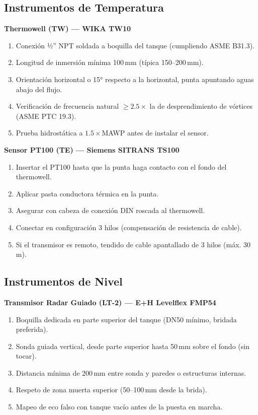 \documentclass[12pt,letterpaper]{article}
\begin{document}
\subsection{Instrumentos de Temperatura}

\textbf{Thermowell (TW) — WIKA TW10}
\begin{enumerate}[leftmargin=1.5cm, label=\arabic*.]
  \item Conexión ½'' NPT soldada a boquilla del tanque (cumpliendo ASME B31.3).
  \item Longitud de inmersión mínima 100\,mm (típica 150--200\,mm).
  \item Orientación horizontal o 15° respecto a la horizontal, punta apuntando aguas abajo del flujo.
  \item Verificación de frecuencia natural $\geq2.5\times$ la de desprendimiento de vórtices (ASME PTC 19.3).
  \item Prueba hidrostática a $1.5\times$MAWP antes de instalar el sensor.
\end{enumerate}

\textbf{Sensor PT100 (TE) — Siemens SITRANS TS100}
\begin{enumerate}[leftmargin=1.5cm, label=\arabic*.]
  \item Insertar el PT100 hasta que la punta haga contacto con el fondo del thermowell.
  \item Aplicar pasta conductora térmica en la punta.
  \item Asegurar con cabeza de conexión DIN roscada al thermowell.
  \item Conectar en configuración 3 hilos (compensación de resistencia de cable).
  \item Si el transmisor es remoto, tendido de cable apantallado de 3 hilos (máx. 30\,m).
\end{enumerate}

\subsection{Instrumentos de Nivel}

\textbf{Transmisor Radar Guiado (LT-2) — E+H Levelflex FMP54}
\begin{enumerate}[leftmargin=1.5cm, label=\arabic*.]
  \item Boquilla dedicada en parte superior del tanque (DN50 mínimo, bridada preferida).
  \item Sonda guiada vertical, desde parte superior hasta 50\,mm sobre el fondo (sin tocar).
  \item Distancia mínima de 200\,mm entre sonda y paredes o estructuras internas.
  \item Respeto de zona muerta superior (50--100\,mm desde la brida).
  \item Mapeo de eco falso con tanque vacío antes de la puesta en marcha.
\end{enumerate}
\end{document}
